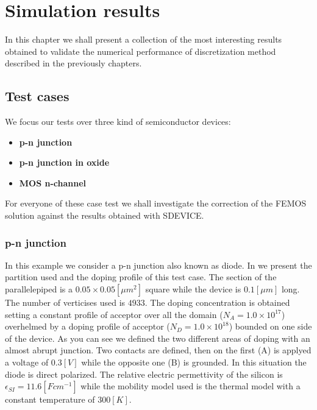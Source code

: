 \chapter{Simulation results}

In this chapter we shall present a collection of the most interesting results obtained to validate the numerical performance of discretization method described in the previously chapters. 

\section{Test cases}


We focus our tests over three kind of semiconductor devices: 

\begin{itemize}
\item {\bf p-n junction}
\item {\bf p-n junction in oxide}
\item {\bf MOS n-channel}
\end{itemize}

For everyone of these case test we shall investigate the correction of the FEMOS solution against the results obtained with SDEVICE.  


\subsection{p-n junction}

In this example we consider a p-n junction also known as diode. In  we present the partition used and the doping profile of this test case. The section of the parallelepiped is a $0.05 \times 0.05 [\mu m^2]$ square while the device is $0.1 [\mu m]$ long.  The number of verticises used is $4933$.  The doping concentration is obtained setting a constant profile of acceptor over all the domain ($N_A = 1.0\times 10^{17}$) overhelmed by a doping profile of acceptor ($N_D=1.0 \times 10^{18}$) bounded on one side of the device. As you can see we defined the two different areas of doping with an almost abrupt junction. 
Two contacts are defined, then on the first (A) is applyed a voltage of $0.3[V]$ while the opposite one (B) is grounded. In this situation the diode is direct polarized. The  relative electric permettivity of the silicon is $\epsilon_{SI} = 11.6 [F cm^{-1}]$ while the mobility model used is the thermal model  with a constant temperature of $300 [K]$.

